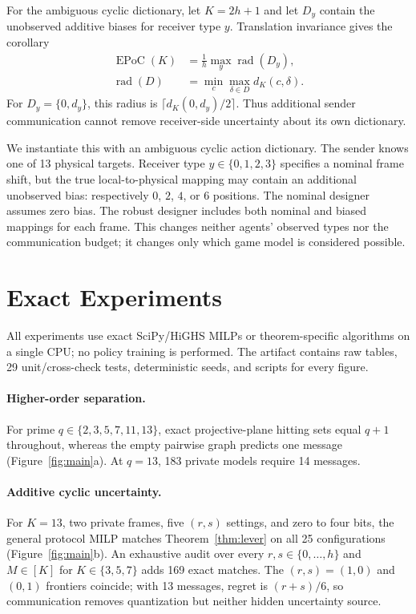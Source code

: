 \documentclass[letterpaper]{article} %
\newcommand{\EPoC}{\operatorname{EPoC}}
\begin{document}
For the ambiguous cyclic dictionary, let $K=2h+1$ and let $D_y$ contain the
unobserved additive biases for receiver type $y$. Translation invariance gives
the corollary
\[
\begin{aligned}
\EPoC(K)&=\frac{1}{h}\max_y\operatorname{rad}(D_y),\\
\operatorname{rad}(D)&=\min_c\max_{\delta\in D}d_K(c,\delta).
\end{aligned}
\]
For $D_y=\{0,d_y\}$, this radius is
$\lceil d_K(0,d_y)/2\rceil$. Thus additional sender communication cannot remove
receiver-side uncertainty about its own dictionary.

We instantiate this with an ambiguous cyclic action dictionary. The sender
knows one of 13 physical targets. Receiver type $y\in\{0,1,2,3\}$ specifies a
nominal frame shift, but the true local-to-physical mapping may contain an
additional unobserved bias: respectively $0$, $2$, $4$, or $6$ positions. The
nominal designer assumes zero bias. The robust designer includes both nominal
and biased mappings for each frame. This changes neither agents' observed types
nor the communication budget; it changes only which game model is considered
possible.

\section{Exact Experiments}

All experiments use exact SciPy/HiGHS MILPs or theorem-specific algorithms on a
single CPU; no policy training is performed. The artifact contains raw tables,
29 unit/cross-check tests, deterministic seeds, and scripts for every figure.

\paragraph{Higher-order separation.}
For prime $q\in\{2,3,5,7,11,13\}$, exact projective-plane hitting sets equal
$q+1$ throughout, whereas the empty pairwise graph predicts one message
(Figure~\ref{fig:main}a). At $q=13$, 183 private models require 14 messages.

\paragraph{Additive cyclic uncertainty.}
For $K=13$, two private frames, five $(r,s)$ settings, and zero to four bits,
the general protocol MILP matches Theorem~\ref{thm:lever} on all 25
configurations (Figure~\ref{fig:main}b). An exhaustive audit over every
$r,s\in\{0,\ldots,h\}$ and $M\in[K]$ for $K\in\{3,5,7\}$ adds 169 exact
matches. The $(r,s)=(1,0)$ and $(0,1)$ frontiers coincide; with 13 messages,
regret is $(r+s)/6$, so communication removes quantization but neither hidden
uncertainty source.
\end{document}
